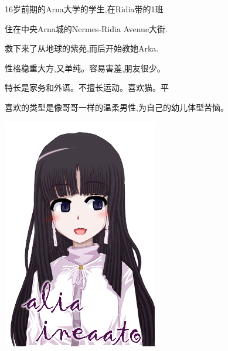 \hfill
\begin{minipage}[b]{0.6\linewidth}
16岁前期的Arna大学的学生,在Ridia带的1班

住在中央Arna城的Nermes-Ridia Avenue大街.

救下来了从地球的紫苑,而后开始教她Arka.

性格稳重大方,又单纯。容易害羞,朋友很少。

特长是家务和外语。不擅长运动。喜欢猫。{\textcolor[rgb]{1,0.92,0.92}{平}}

喜欢的类型是像哥哥一样的温柔男性,为自己的幼儿体型苦恼。 

\end{minipage}




\begin{minipage}[b]{0.4\linewidth}

\includegraphics[width=\linewidth]{pngs/aria3.png}

\end{minipage}
